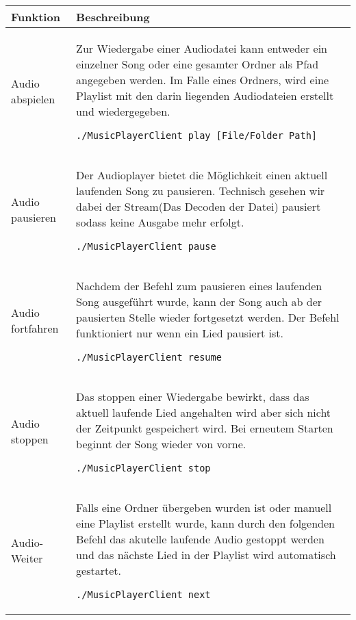 \begin{longtable}{l|l} 
\rowcolor{Gray}
Funktion & Beschreibung \\ \hline

Audio abspielen & \begin{minipage}[t]{.558\textwidth} Zur Wiedergabe einer Audiodatei kann entweder ein einzelner Song oder eine gesamter Ordner als Pfad angegeben werden. Im Falle eines Ordners, wird eine Playlist mit den darin liegenden Audiodateien erstellt und wiedergegeben. \begin{lstlisting}
./MusicPlayerClient play [File/Folder Path]
\end{lstlisting} \end{minipage} \\\hline

Audio pausieren & \begin{minipage}[t]{.558\textwidth} Der Audioplayer bietet die Möglichkeit einen aktuell laufenden Song zu pausieren. Technisch gesehen wir dabei der Stream(Das Decoden der Datei) pausiert sodass keine Ausgabe mehr erfolgt. \begin{lstlisting}
./MusicPlayerClient pause
\end{lstlisting} \end{minipage} \\ \hline

Audio fortfahren & \begin{minipage}[t]{.558\textwidth} Nachdem der Befehl zum pausieren eines laufenden Song ausgeführt wurde, kann der Song auch ab der pausierten Stelle wieder fortgesetzt werden. Der Befehl funktioniert nur wenn ein Lied pausiert ist. \begin{lstlisting}
./MusicPlayerClient resume
\end{lstlisting} \end{minipage} \\ \hline

Audio stoppen & \begin{minipage}[t]{.558\textwidth} Das stoppen einer Wiedergabe bewirkt, dass das aktuell laufende Lied angehalten wird aber sich nicht der Zeitpunkt gespeichert wird. Bei erneutem Starten beginnt der Song wieder von vorne. \begin{lstlisting}
./MusicPlayerClient stop
\end{lstlisting} \end{minipage} \\ \hline

Audio-Weiter & \begin{minipage}[t]{.558\textwidth} Falls eine Ordner übergeben wurden ist oder manuell eine Playlist erstellt wurde, kann durch den folgenden Befehl das akutelle laufende Audio gestoppt werden und das nächste Lied in der Playlist wird automatisch gestartet. \begin{lstlisting}
./MusicPlayerClient next
\end{lstlisting} \end{minipage} \\ \hline


\end{longtable}
